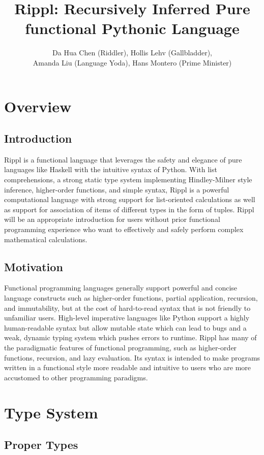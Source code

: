﻿\documentclass[5pt]{article}
\title{Rippl: Recursively Inferred Pure functional Pythonic Language}
\author{Da Hua Chen (Riddler), Hollis Lehv (Gallbladder),\\Amanda Liu (Language Yoda), Hans Montero (Prime Minister)}
\date{}
\begin{document}
\maketitle
\section{Overview}

\subsection{Introduction}
Rippl is a functional language that leverages the safety and elegance of pure languages like Haskell with the intuitive syntax of Python. With list comprehensions, a strong static type system implementing Hindley-Milner style inference, higher-order functions, and simple syntax, Rippl is a powerful computational language with strong support for list-oriented calculations as well as support for association of items of different types in the form of tuples. Rippl will be an appropriate introduction for users without prior functional programming experience who want to effectively and safely perform complex mathematical calculations.


\subsection{Motivation}
Functional programming languages generally support powerful and concise language constructs such as higher-order functions, partial application, recursion, and immutability, but at the cost of hard-to-read syntax that is not friendly to unfamiliar users. High-level imperative languages like Python support a highly human-readable syntax but allow mutable state which can lead to bugs and a weak, dynamic typing system which pushes errors to runtime. Rippl has many of the paradigmatic features of functional programming, such as higher-order functions, recursion, and lazy evaluation. Its syntax is intended to make programs written in a functional style more readable and intuitive to users who are more accustomed  to other programming paradigms.

\pagebreak

\section{Type System}

\subsection{Proper Types}
\end{document}
